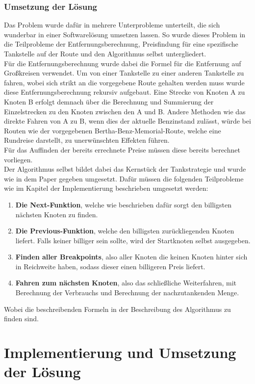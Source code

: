 \documentclass[11pt]{article}
\begin{document}
\subsubsection{Umsetzung der Lösung}
	Das Problem wurde dafür in mehrere Unterprobleme unterteilt, die sich wunderbar in einer Softwarelösung umsetzen lassen. So wurde dieses Problem in die Teilprobleme der Entfernungsberechnung, Preisfindung für eine spezifische Tankstelle auf der Route und den Algorithmus selbst untergliedert. \\
	Für die Entfernungsberechnung wurde dabei die Formel für die Entfernung auf Großkreisen verwendet. Um von einer Tankstelle zu einer anderen Tankstelle zu fahren, wobei sich strikt an die vorgegebene Route gehalten werden muss wurde diese Entfernungsberechnung rekursiv aufgebaut. Eine Strecke von Knoten A zu Knoten B erfolgt demnach über die Berechnung und Summierung der Einzelstrecken zu den Knoten zwischen den A und B. Andere Methoden wie das direkte Fahren von A zu B, wenn dies der aktuelle Benzinstand zulässt, würde bei Routen wie der vorgegebenen Bertha-Benz-Memorial-Route, welche eine Rundreise darstellt, zu unerwünschten Effekten führen. \\
	Für das Auffinden der bereits errechnete Preise müssen diese bereits berechnet vorliegen. \\
	Der Algorithmus selbst bildet dabei das Kernstück der Tankstrategie und wurde wie in dem Paper gegeben umgesetzt. Dafür müssen die folgenden Teilprobleme wie im Kapitel der Implementierung beschrieben umgesetzt werden:
	\begin{enumerate}
		\item \textbf{Die Next-Funktion}, welche wie beschrieben dafür sorgt den billigsten nächsten Knoten zu finden.
		\item \textbf{Die Previous-Funktion}, welche den billigsten zurückliegenden Knoten liefert. Falls keiner billiger sein sollte, wird der Startknoten selbst ausgegeben.
		\item \textbf{Finden aller Breakpoints}, also aller Knoten die keinen Knoten hinter sich in Reichweite haben, sodass dieser einen billigeren Preis liefert.
		\item \textbf{Fahren zum nächsten Knoten}, also das schließliche Weiterfahren, mit Berechnung der Verbrauchs und Berechnung der nachzutankenden Menge.
	\end{enumerate}
	Wobei die beschreibenden Formeln in der Beschreibung des Algorithmus zu finden sind.
	
\section{Implementierung und Umsetzung der Lösung}
	
\end{document}
